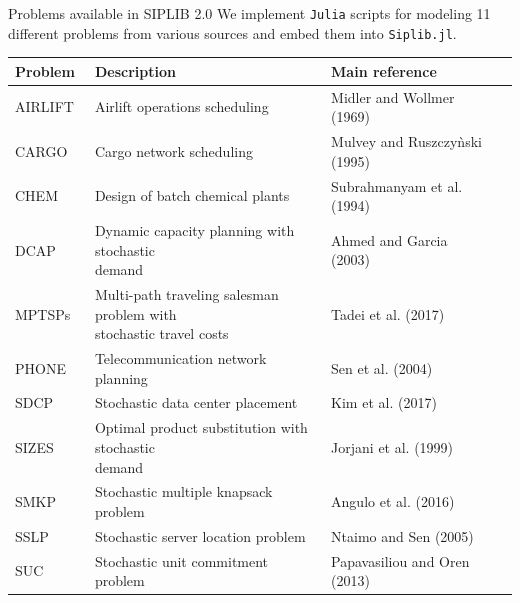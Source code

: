 \documentclass{beamer}
\def\ttiny{\fontsize{6pt}{6pt}\selectfont}
\newcommand{\siplibtwo}{\textsf{SIPLIB 2.0}}
\newcommand{\airlift}{\textsf{AIRLIFT}}
\newcommand{\chem}{\textsf{CHEM}}
\newcommand{\dcap}{\textsf{DCAP}}
\newcommand{\sdcp}{\textsf{SDCP}}
\newcommand{\mptsps}{\textsf{MPTSPs}}
\newcommand{\sizes}{\textsf{SIZES}}
\newcommand{\smkp}{\textsf{SMKP}}
\newcommand{\sslp}{\textsf{SSLP}}
\newcommand{\suc}{\textsf{SUC}}
\newcommand{\cargo}{\textsf{CARGO}}
\newcommand{\phone}{\textsf{PHONE}}
\newcommand{\siplibjl}{\texttt{Siplib.jl}}
\begin{document}
\begin{frame}{Problems available in \siplibtwo}
We implement \texttt{Julia} scripts for modeling 11 different problems from various sources and embed them into \siplibjl.
\ttiny
\begin{table}[H]
\centering
\label{table:problems}
\begin{tabular}{@{}llll@{}}
\toprule
Problem		  		  & Description                                                        & Main reference              \\ \midrule
\airlift\ & Airlift operations scheduling & Midler and Wollmer (1969)  \\
\cargo\ & Cargo network scheduling  & Mulvey and Ruszczy\`{n}ski (1995) \\
\chem\ & Design of batch chemical plants& Subrahmanyam et al. (1994) \\				
\dcap\         & \makecell[tl]{Dynamic capacity planning with stochastic\\ demand  }                  & Ahmed and Garcia (2003)                           \\
\mptsps\       & \makecell[tl]{Multi-path traveling salesman problem with\\ stochastic travel costs } & Tadei et al. (2017)                             \\
\phone\       & Telecommunication network planning & Sen et al. (2004)                            \\
\sdcp\ 	& Stochastic data center placement  & Kim et al. (2017) \\
\sizes\        & \makecell[tl]{Optimal product substitution with stochastic\\ demand}         & Jorjani et al. (1999)        \\
\smkp\		  & Stochastic multiple knapsack problem                               & Angulo et al. (2016)                           \\
\sslp\         & Stochastic server location problem                                 & Ntaimo and Sen (2005)                           \\
\suc\         & Stochastic unit commitment problem			               & Papavasiliou and Oren (2013)                        \\ \bottomrule
\end{tabular}%
\end{table}
\end{frame}
\end{document}
